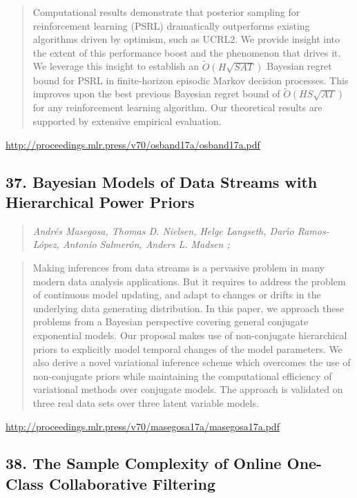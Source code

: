 \documentclass{article}
\begin{document}
\begin{quote}
    Computational results demonstrate that posterior sampling for reinforcement learning (PSRL) dramatically outperforms existing algorithms driven by optimism, such as UCRL2. We provide insight into the extent of this performance boost and the phenomenon that drives it. We leverage this insight to establish an $\tilde{O}(H\sqrt{SAT})$ Bayesian regret bound for PSRL in finite-horizon episodic Markov decision processes. This improves upon the best previous Bayesian regret bound of $\tilde{O}(H S \sqrt{AT})$ for any reinforcement learning algorithm. Our theoretical results are supported by extensive empirical evaluation.  \end{quote}

\href{http://proceedings.mlr.press/v70/osband17a/osband17a.pdf}{http://proceedings.mlr.press/v70/osband17a/osband17a.pdf}

\subsection{37. Bayesian Models of Data Streams with Hierarchical Power Priors}

\begin{quote}
\footnotesize{\textit{Andrés Masegosa, Thomas D. Nielsen, Helge Langseth, Darı́o Ramos-López, Antonio Salmerón, Anders L. Madsen ;}}
\end{quote}

\begin{quote}
    Making inferences from data streams is a pervasive problem in many modern data analysis applications. But it requires to address the problem of continuous model updating, and adapt to changes or drifts in the underlying data generating distribution. In this paper, we approach these problems from a Bayesian perspective covering general conjugate exponential models. Our proposal makes use of non-conjugate hierarchical priors to explicitly model temporal changes of the model parameters. We also derive a novel variational inference scheme which overcomes the use of non-conjugate priors while maintaining the computational efficiency of variational methods over conjugate models. The approach is validated on three real data sets over three latent variable models.  \end{quote}

\href{http://proceedings.mlr.press/v70/masegosa17a/masegosa17a.pdf}{http://proceedings.mlr.press/v70/masegosa17a/masegosa17a.pdf}

\subsection{38. The Sample Complexity of Online One-Class Collaborative Filtering}
\end{document}
